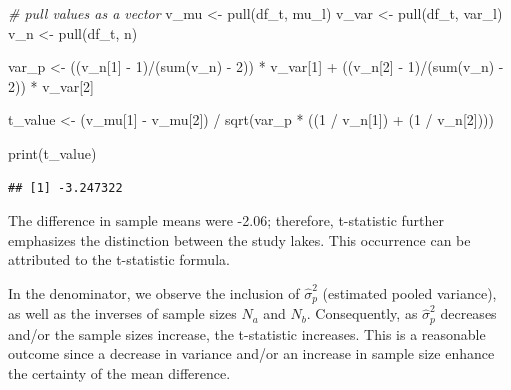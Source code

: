 \documentclass[
]{article}
\newenvironment{Shaded}{\begin{snugshade}}{\end{snugshade}}
\newcommand{\CommentTok}[1]{\textcolor[rgb]{0.56,0.35,0.01}{\textit{#1}}}
\newcommand{\DecValTok}[1]{\textcolor[rgb]{0.00,0.00,0.81}{#1}}
\newcommand{\FunctionTok}[1]{\textcolor[rgb]{0.00,0.00,0.00}{#1}}
\newcommand{\NormalTok}[1]{#1}
\newcommand{\OtherTok}[1]{\textcolor[rgb]{0.56,0.35,0.01}{#1}}
\newcommand{\SpecialCharTok}[1]{\textcolor[rgb]{0.00,0.00,0.00}{#1}}
\begin{document}
\begin{Shaded}
\begin{Highlighting}[]
\CommentTok{\# pull values as a vector}
\NormalTok{v\_mu }\OtherTok{\textless{}{-}} \FunctionTok{pull}\NormalTok{(df\_t, mu\_l)}
\NormalTok{v\_var }\OtherTok{\textless{}{-}} \FunctionTok{pull}\NormalTok{(df\_t, var\_l)}
\NormalTok{v\_n }\OtherTok{\textless{}{-}} \FunctionTok{pull}\NormalTok{(df\_t, n)}

\NormalTok{var\_p }\OtherTok{\textless{}{-}}\NormalTok{ ((v\_n[}\DecValTok{1}\NormalTok{] }\SpecialCharTok{{-}} \DecValTok{1}\NormalTok{)}\SpecialCharTok{/}\NormalTok{(}\FunctionTok{sum}\NormalTok{(v\_n) }\SpecialCharTok{{-}} \DecValTok{2}\NormalTok{)) }\SpecialCharTok{*}\NormalTok{ v\_var[}\DecValTok{1}\NormalTok{] }\SpecialCharTok{+}
\NormalTok{  ((v\_n[}\DecValTok{2}\NormalTok{] }\SpecialCharTok{{-}} \DecValTok{1}\NormalTok{)}\SpecialCharTok{/}\NormalTok{(}\FunctionTok{sum}\NormalTok{(v\_n) }\SpecialCharTok{{-}} \DecValTok{2}\NormalTok{)) }\SpecialCharTok{*}\NormalTok{ v\_var[}\DecValTok{2}\NormalTok{]}

\NormalTok{t\_value }\OtherTok{\textless{}{-}}\NormalTok{ (v\_mu[}\DecValTok{1}\NormalTok{] }\SpecialCharTok{{-}}\NormalTok{ v\_mu[}\DecValTok{2}\NormalTok{]) }\SpecialCharTok{/} \FunctionTok{sqrt}\NormalTok{(var\_p }\SpecialCharTok{*}\NormalTok{ ((}\DecValTok{1} \SpecialCharTok{/}\NormalTok{ v\_n[}\DecValTok{1}\NormalTok{]) }\SpecialCharTok{+}\NormalTok{ (}\DecValTok{1} \SpecialCharTok{/}\NormalTok{ v\_n[}\DecValTok{2}\NormalTok{])))}

\FunctionTok{print}\NormalTok{(t\_value)}
\end{Highlighting}
\end{Shaded}

\begin{verbatim}
## [1] -3.247322
\end{verbatim}

The difference in sample means were -2.06; therefore, t-statistic further emphasizes the distinction between the study lakes. This occurrence can be attributed to the t-statistic formula.

In the denominator, we observe the inclusion of \(\hat{\sigma}^2_p\) (estimated pooled variance), as well as the inverses of sample sizes \(N_a\) and \(N_b\). Consequently, as \(\hat{\sigma}^2_p\) decreases and/or the sample sizes increase, the t-statistic increases. This is a reasonable outcome since a decrease in variance and/or an increase in sample size enhance the certainty of the mean difference.
\end{document}
